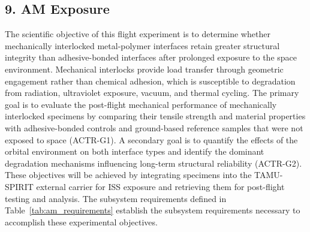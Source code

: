 \documentclass[conf]{new-aiaa}
\begin{document}
\clearpage
\subsection{9. AM Exposure}

The scientific objective of this flight experiment is to determine whether mechanically interlocked metal-polymer interfaces retain greater structural integrity than adhesive-bonded interfaces after prolonged exposure to the space environment. Mechanical interlocks provide load transfer through geometric engagement rather than chemical adhesion, which is susceptible to degradation from radiation, ultraviolet exposure, vacuum, and thermal cycling. The primary goal is to evaluate the post-flight mechanical performance of mechanically interlocked specimens by comparing their tensile strength and material properties with adhesive-bonded controls and ground-based reference samples that were not exposed to space (ACTR-G1). A secondary goal is to quantify the effects of the orbital environment on both interface types and identify the dominant degradation mechanisms influencing long-term structural reliability (ACTR-G2). These objectives will be achieved by integrating specimens into the TAMU-SPIRIT external carrier for ISS exposure and retrieving them for post-flight testing and analysis. The subsystem requirements defined in Table~\ref{tab:am_requirements} establish the subsystem requirements necessary to accomplish these experimental objectives.
\end{document}
